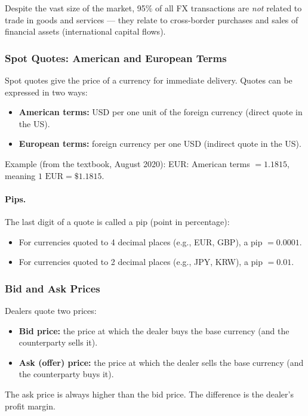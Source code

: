 \documentclass[11pt,a4paper]{article}
\begin{document}
Despite the vast size of the market, 95\% of all FX transactions are \textit{not} related to trade in goods and services — they relate to cross-border purchases and sales of financial assets (international capital flows).

\subsubsection{Spot Quotes: American and European Terms}

Spot quotes give the price of a currency for immediate delivery. Quotes can be expressed in two ways:
\begin{itemize}
  \item \textbf{American terms:} USD per one unit of the foreign currency (direct quote in the US).
  \item \textbf{European terms:} foreign currency per one USD (indirect quote in the US).
\end{itemize}

Example (from the textbook, August 2020): EUR: American terms $= 1.1815$, meaning $1 \text{ EUR} = \$1.1815$.

\paragraph{Pips.}
The last digit of a quote is called a pip (point in percentage):
\begin{itemize}
  \item For currencies quoted to 4 decimal places (e.g., EUR, GBP), a pip $= 0.0001$.
  \item For currencies quoted to 2 decimal places (e.g., JPY, KRW), a pip $= 0.01$.
\end{itemize}

\subsubsection{Bid and Ask Prices}

Dealers quote two prices:
\begin{itemize}
  \item \textbf{Bid price:} the price at which the dealer buys the base currency (and the counterparty sells it).
  \item \textbf{Ask (offer) price:} the price at which the dealer sells the base currency (and the counterparty buys it).
\end{itemize}

The ask price is always higher than the bid price. The difference is the dealer's profit margin.
\end{document}

